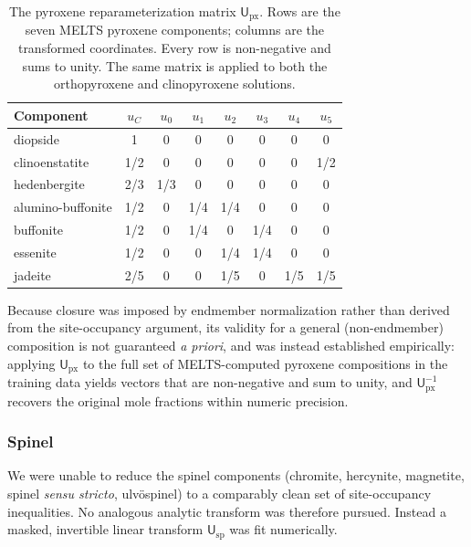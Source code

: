 \begin{table}[t]
\centering
\caption{The pyroxene reparameterization matrix $\mathsf{U}_{\mathrm{px}}$. Rows are
the seven \textsc{MELTS} pyroxene components; columns are the transformed
coordinates. Every row is non-negative and sums to unity. The same matrix is applied
to both the orthopyroxene and clinopyroxene solutions.}
\label{tab:pxmatrix}
\begin{tabular}{lccccccc}
\toprule
Component & $u_C$ & $u_0$ & $u_1$ & $u_2$ & $u_3$ & $u_4$ & $u_5$ \\
\midrule
diopside          & 1   & 0   & 0   & 0   & 0   & 0   & 0 \\
clinoenstatite    & 1/2 & 0   & 0   & 0   & 0   & 0   & 1/2 \\
hedenbergite      & 2/3 & 1/3 & 0   & 0   & 0   & 0   & 0 \\
alumino-buffonite & 1/2 & 0   & 1/4 & 1/4 & 0   & 0   & 0 \\
buffonite         & 1/2 & 0   & 1/4 & 0   & 1/4 & 0   & 0 \\
essenite          & 1/2 & 0   & 0   & 1/4 & 1/4 & 0   & 0 \\
jadeite           & 2/5 & 0   & 0   & 1/5 & 0   & 1/5 & 1/5 \\
\bottomrule
\end{tabular}
\end{table}

Because closure was imposed by endmember normalization rather than derived from the
site-occupancy argument, its validity for a general (non-endmember) composition is
not guaranteed \emph{a priori}, and was instead established empirically: applying
$\mathsf{U}_{\mathrm{px}}$ to the full set of \textsc{MELTS}-computed pyroxene
compositions in the training data yields vectors that are non-negative and sum to
unity, and $\mathsf{U}_{\mathrm{px}}^{-1}$ recovers the original mole fractions 
within numeric precision.

\subsubsection{Spinel} We were unable to reduce the spinel components (chromite, hercynite, magnetite, spinel
\emph{sensu stricto}, ulv\"ospinel) to a comparably clean set of site-occupancy inequalities. No analogous
analytic transform was therefore pursued. Instead a masked, invertible linear
transform $\mathsf{U}_{\mathrm{sp}}$ was fit numerically.

